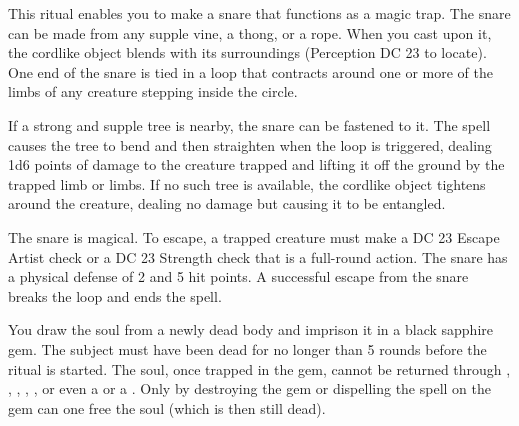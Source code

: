 \spelleffect This ritual enables you to make a snare that functions as a magic trap. The snare can be made from any supple vine, a thong, or a rope. When you cast  upon it, the cordlike object blends with its surroundings (Perception DC 23 to locate). One end of the snare is tied in a loop that contracts around one or more of the limbs of any creature stepping inside the circle.
\par If a strong and supple tree is nearby, the snare can be fastened to it. The spell causes the tree to bend and then straighten when the loop is triggered, dealing 1d6 points of damage to the creature trapped and lifting it off the ground by the trapped limb or limbs. If no such tree is available, the cordlike object tightens around the creature, dealing no damage but causing it to be entangled.
\par The snare is magical. To escape, a trapped creature must make a DC 23 Escape Artist check or a DC 23 Strength check that is a full-round action. The snare has a physical defense of 2 and 5 hit points. A successful escape from the snare breaks the loop and ends the spell.

\spelleffect You draw the soul from a newly dead body and imprison it in a black sapphire gem. The subject must have been dead for no longer than 5 rounds before the ritual is started. The soul, once trapped in the gem, cannot be returned through , , , , , or even a  or a . Only by destroying the gem or dispelling the spell on the gem can one free the soul (which is then still dead).

